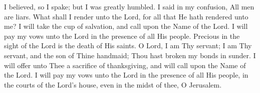 I believed, so I spake; but I was greatly humbled. I said in my confusion, All men are liars. What shall I render unto the Lord, for all that He hath rendered unto me? I will take the cup of salvation, and call upon the Name of the Lord. I will pay my vows unto the Lord in the presence of all His people. Precious in the sight of the Lord is the death of His saints. O Lord, I am Thy servant; I am Thy servant, and the son of Thine handmaid; Thou hast broken my bonds in sunder. I will offer unto Thee a sacrifice of thanksgiving, and will call upon the Name of the Lord. I will pay my vows unto the Lord in the presence of all His people, in the courts of the Lord’s house, even in the midst of thee, O Jerusalem.
